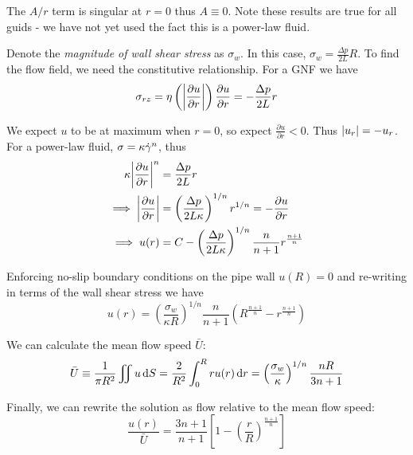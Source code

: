 \documentclass{jknotes}
\begin{document}
The $A/r$ term is singular at $r=0$ thus $A \equiv 0$. Note these results are
true for all guids - we have not yet used the fact this is a power-law fluid.

Denote the \emph{magnitude of wall shear stress} as $\sigma_w$. In this case,
$\sigma_w = \frac{\Delta p}{2L}R$.  To find the flow field, we need the
constitutive relationship. For a GNF we have
\begin{equation}
	\sigma_{rz} = \eta\left(\abs{\frac{\partial u}{\partial r}}\right)
	\frac{\partial u}{\partial r} = -\frac{\Delta p}{2L} r
\end{equation}

We expect $u$ to be at maximum when $r=0$, so expect $\frac{\partial
u}{\partial r} < 0$. Thus $\abs{u_r} = -u_r$. For a power-law fluid, $\sigma =
\kappa \dot{\gamma}^n$, thus
\begin{equation}
	\begin{aligned}
		\kappa \abs{\frac{\partial u}{\partial r}}^n &= \frac{\Delta p}{2L} r
		\\
		\implies \abs{\frac{\partial u}{\partial r}} &= \left(\frac{\Delta p}{2
		L \kappa}\right)^{1/n} r^{1/n} = -\frac{\partial u}{\partial r} \\
		\implies u(r) &= C - \left(\frac{\Delta p}{2 L \kappa}\right)^{1/n}
		\frac{n}{n+1} r^{\frac{n+1}{n}}
	\end{aligned}
\end{equation}

Enforcing no-slip boundary conditions on the pipe wall $u(R) = 0$ and
re-writing in terms of the wall shear stress we have
\begin{equation}
	u(r) = \left(\frac{\sigma_w}{\kappa R}\right)^{1/n} \frac{n}{n+1}\left(
	R^{\frac{n+1}{n}} - r^{\frac{n+1}{n}}\right)
\end{equation}

We can calculate the mean flow speed $\bar{U}$:
\begin{equation}
	\bar{U} \equiv \frac{1}{\pi R^2} \iint u \, \diffd S = \frac{2}{R^2}
	\int_0^R ru(r) \, \diffd r = \left(\frac{\sigma_w}{\kappa}\right)^{1/n}
	\frac{nR}{3n+1}
\end{equation}

Finally, we can rewrite the solution as flow relative to the mean flow speed:
\begin{equation}
	\frac{u(r)}{\bar{U}} = \frac{3n+1}{n+1} \left[ 1-
	\left(\frac{r}{R}\right)^{\frac{n+1}{n}}\right]
\end{equation}

\begin{center}
\end{center}
\end{document}
